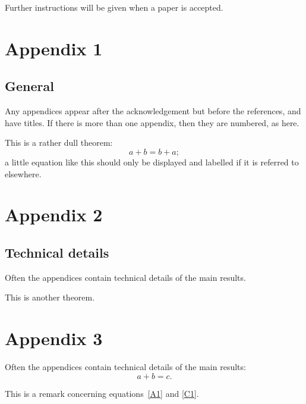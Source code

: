 \documentclass[article,lineno]{biometrika}
\begin{document}
Further instructions will be given when a paper is accepted.


\appendix

\appendixone
\section*{Appendix 1}
\subsection*{General}

Any appendices appear after the acknowledgement but before the references, and have titles. If there is more than one appendix, then they are numbered, as here.

\begin{theorem}
This is a rather dull theorem:
\begin{equation}
\label{A1}
a + b = b + a;
\end{equation}
a little equation like this should only be displayed and labelled if it is referred to elsewhere.
\end{theorem}

\appendixtwo
\section*{Appendix 2}
\subsection*{Technical details}

Often the appendices contain technical details of the main results.

\begin{theorem}
This is another theorem.
\end{theorem}

\appendixthree
\section*{Appendix 3}

Often the appendices contain technical details of the main results:
\begin{equation}
\label{C1}
a + b = c.
\end{equation}

\begin{remark}
This is a remark concerning equations~\eqref{A1} and \eqref{C1}.
\end{remark}
\end{document}
